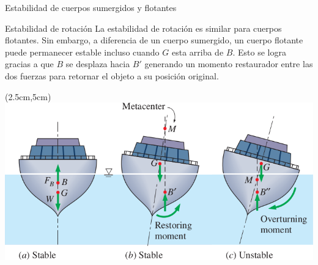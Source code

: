 \documentclass [xcolor=svgnames, t] {beamer}
\begin{document}
\begin{frame}{Estabilidad de cuerpos sumergidos y flotantes}
\begin{block}{Estabilidad de rotaci\'on}
La estabilidad de rotaci\'on es similar para cuerpos flotantes. Sin embargo, a diferencia de un cuerpo sumergido, un cuerpo flotante puede permanecer estable incluso cuando $G$ esta arriba de $B$. Esto se logra gracias a que $B$ se desplaza hacia $B'$ generando un momento restaurador entre las dos fuerzas para retornar el objeto a su posici\'on  original. 
\begin{textblock*}{8cm}(2.5cm,5cm) %
\includegraphics[width=\textwidth]{rota3}
\end{textblock*}
\end{block}
\end{frame}
\end{document}
